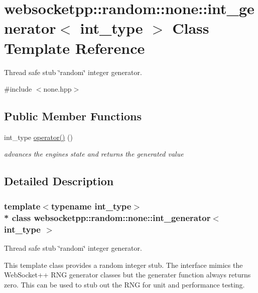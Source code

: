 \hypertarget{classwebsocketpp_1_1random_1_1none_1_1int__generator}{}\section{websocketpp\+:\+:random\+:\+:none\+:\+:int\+\_\+generator$<$ int\+\_\+type $>$ Class Template Reference}
\label{classwebsocketpp_1_1random_1_1none_1_1int__generator}


Thread safe stub \char`\"{}random\char`\"{} integer generator.  




{\ttfamily \#include $<$none.\+hpp$>$}

\subsection*{Public Member Functions}
\begin{DoxyCompactItemize}
\item 
int\+\_\+type \hyperlink{classwebsocketpp_1_1random_1_1none_1_1int__generator_aecc2404c6eef19dbb5e585344bdd9069}{operator()} ()\hypertarget{classwebsocketpp_1_1random_1_1none_1_1int__generator_aecc2404c6eef19dbb5e585344bdd9069}{}\label{classwebsocketpp_1_1random_1_1none_1_1int__generator_aecc2404c6eef19dbb5e585344bdd9069}

\begin{DoxyCompactList}\small\item\em advances the engine\textquotesingle{}s state and returns the generated value \end{DoxyCompactList}\end{DoxyCompactItemize}


\subsection{Detailed Description}
\subsubsection*{template$<$typename int\+\_\+type$>$\\*
class websocketpp\+::random\+::none\+::int\+\_\+generator$<$ int\+\_\+type $>$}

Thread safe stub \char`\"{}random\char`\"{} integer generator. 

This template class provides a random integer stub. The interface mimics the Web\+Socket++ R\+NG generator classes but the generater function always returns zero. This can be used to stub out the R\+NG for unit and performance testing.

